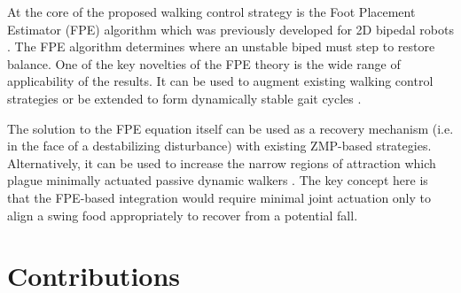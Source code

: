 At the core of the proposed walking control strategy is the Foot Placement Estimator (FPE) algorithm which was previously developed for 2D bipedal robots \cite{Wight:2008vt}. The FPE algorithm determines where an unstable biped must step to restore balance. One of the key novelties of the FPE theory is the wide range of applicability of the results. It can be used to augment existing walking control strategies or be extended to form dynamically stable gait cycles \cite{Wight:2008ii}.

The solution to the FPE equation itself can be used as a recovery mechanism (i.e. in the face of a destabilizing disturbance) with existing ZMP-based strategies. Alternatively, it can be used to increase the narrow regions of attraction which plague minimally actuated passive dynamic walkers \cite{Goswami:1996gn,Asano:2000wi,Kuo:1999tn}. The key concept here is that the FPE-based integration would require minimal joint actuation only to align a swing food appropriately to recover from a potential fall. 

\section{Contributions} %
\label{sec:contributions}

